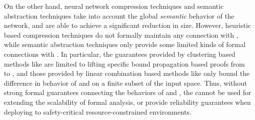 On the other hand, neural network compression techniques \cite{dnn-compression}
and semantic abstraction techniques \cite{deep-abstract,lin-comb-abs-jan} take
into account the global \textit{semantic} behavior of the network, and are able
to achieve a significant reduction in size.
However, heuristic based compression techniques \cite{dnn-compression} do not
formally maintain any connection with \cnc, while semantic abstraction
\cite{deep-abstract,lin-comb-abs-jan} techniques only provide some limited
kinds of formal connections with \cnc. 
In particular, the guarantees provided by clustering based methods like
\cite{deep-abstract} are limited to lifting specific bound propagation based
proofs from \abs to \cnc, 
and those provided by linear combination based methods like
\cite{lin-comb-abs-jan} only bound the difference in behavior of \abs and \cnc
on a finite subset of the input space.
Thus, without strong formal guarantees connecting the behaviors of \abs and
\cnc, the \abs cannot be used for extending the scalability of formal analysis,
or provide reliability guarantees when deploying to safety-critical
resource-constrained environments.



